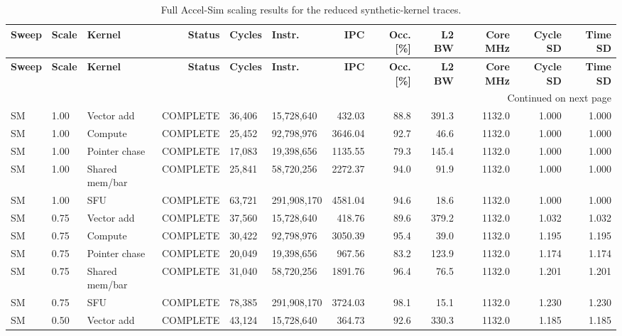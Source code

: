 \begin{landscape}
\begin{scriptsize}
\begin{longtable}{lllrllrrrrrr}
\caption{Full Accel-Sim scaling results for the reduced synthetic-kernel traces.}
\label{tab:appendix-accelsim-scaling-full} \\
\toprule
\textbf{Sweep} & \textbf{Scale} & \textbf{Kernel} & \textbf{Status} & \textbf{Cycles} & \textbf{Instr.} & \textbf{IPC} & \textbf{Occ. [\%]} & \textbf{L2 BW} & \textbf{Core MHz} & \textbf{Cycle SD} & \textbf{Time SD} \\
\midrule
\endfirsthead
\toprule
\textbf{Sweep} & \textbf{Scale} & \textbf{Kernel} & \textbf{Status} & \textbf{Cycles} & \textbf{Instr.} & \textbf{IPC} & \textbf{Occ. [\%]} & \textbf{L2 BW} & \textbf{Core MHz} & \textbf{Cycle SD} & \textbf{Time SD} \\
\midrule
\endhead
\midrule
\multicolumn{12}{r}{Continued on next page} \\
\midrule
\endfoot
\bottomrule
\endlastfoot
SM & 1.00 & Vector add & COMPLETE & 36,406 & 15,728,640 & 432.03 & 88.8 & 391.3 & 1132.0 & 1.000 & 1.000 \\
SM & 1.00 & Compute & COMPLETE & 25,452 & 92,798,976 & 3646.04 & 92.7 & 46.6 & 1132.0 & 1.000 & 1.000 \\
SM & 1.00 & Pointer chase & COMPLETE & 17,083 & 19,398,656 & 1135.55 & 79.3 & 145.4 & 1132.0 & 1.000 & 1.000 \\
SM & 1.00 & Shared mem/bar & COMPLETE & 25,841 & 58,720,256 & 2272.37 & 94.0 & 91.9 & 1132.0 & 1.000 & 1.000 \\
SM & 1.00 & SFU & COMPLETE & 63,721 & 291,908,170 & 4581.04 & 94.6 & 18.6 & 1132.0 & 1.000 & 1.000 \\
SM & 0.75 & Vector add & COMPLETE & 37,560 & 15,728,640 & 418.76 & 89.6 & 379.2 & 1132.0 & 1.032 & 1.032 \\
SM & 0.75 & Compute & COMPLETE & 30,422 & 92,798,976 & 3050.39 & 95.4 & 39.0 & 1132.0 & 1.195 & 1.195 \\
SM & 0.75 & Pointer chase & COMPLETE & 20,049 & 19,398,656 & 967.56 & 83.2 & 123.9 & 1132.0 & 1.174 & 1.174 \\
SM & 0.75 & Shared mem/bar & COMPLETE & 31,040 & 58,720,256 & 1891.76 & 96.4 & 76.5 & 1132.0 & 1.201 & 1.201 \\
SM & 0.75 & SFU & COMPLETE & 78,385 & 291,908,170 & 3724.03 & 98.1 & 15.1 & 1132.0 & 1.230 & 1.230 \\
SM & 0.50 & Vector add & COMPLETE & 43,124 & 15,728,640 & 364.73 & 92.6 & 330.3 & 1132.0 & 1.185 & 1.185 \\

\end{longtable}
\end{scriptsize}
\end{landscape}
